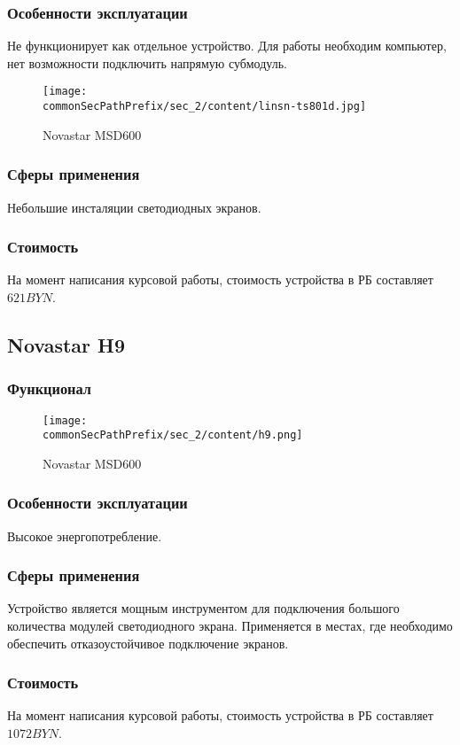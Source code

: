\subsubsection{Особенности эксплуатации}
Не функционирует как отдельное устройство. Для работы необходим компьютер, нет возможности подключить напрямую субмодуль.
\begin{figure}[ht]
    \centering
    \texttt{[image: \\commonSecPathPrefix/sec\_2/content/linsn-ts801d.jpg]}
    \caption{Novastar MSD600}
\end{figure}
\subsubsection{Сферы применения}
Небольшие инсталяции светодиодных экранов.
\subsubsection{Стоимость}
На момент написания курсовой работы, стоимость устройства в РБ составляет \(621BYN\).

\subsection{Novastar H9}
\subsubsection{Функционал}
\begin{figure}[ht]
    \centering
    \texttt{[image: \\commonSecPathPrefix/sec\_2/content/h9.png]}
    \caption{Novastar MSD600}
\end{figure}
\subsubsection{Особенности эксплуатации}
Высокое энергопотребление.
\subsubsection{Сферы применения}
Устройство является мощным инструментом для подключения большого количества модулей светодиодного экрана. Применяется в местах, где необходимо обеспечить отказоустойчивое подключение экранов.
\subsubsection{Стоимость}
На момент написания курсовой работы, стоимость устройства в РБ составляет \(1072BYN\).
